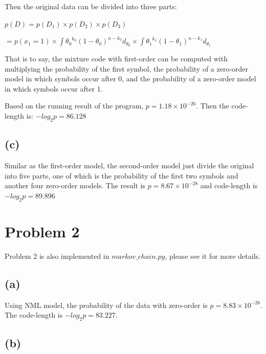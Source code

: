 \documentclass{article}
\begin{document}
Then the original data can be divided into three parts:

\vspace{2mm}

$p(D)=p(D_1) \times p(D_2) \times p(D_3)$

\vspace{1mm}

$=p(x_1=1)\times\int{\theta_0}^{k_0}(1-\theta_0)^{n-k_0}d_{\theta_0}\times\int{\theta_1}^{k_1}(1-\theta_1)^{n-k_1}d_{\theta_1}$

\vspace{2mm}

That is to say, the mixture code with first-order can be computed with multiplying the probability of the first symbol, the probability of a zero-order model in which symbols occur after 0, and the probability of a zero-order model in which symbols occur after 1.

\vspace{2mm}

Based on the running result of the program, $p=1.18 \times 10^{-26}$. Then the code-length is: $-log_2p=86.128$

\subsection*{(c)}

Similar as the first-order model, the second-order model just divide the original into five parts, one of which is the probability of the first two symbols and another four zero-order models. The result is $p=8.67 \times 10^{-28}$ and code-length is $-log_2p=89.896$

\section{Problem 2}

Problem 2 is also implemented in \emph{$markov\_chain.py$}, please see it for more details.

\subsection*{(a)}

Using NML model, the probability of the data with zero-order is $p=8.83 \times 10^{-26}$. The code-length is $-log_2p=83.227$. 

\subsection*{(b)}
\end{document}
